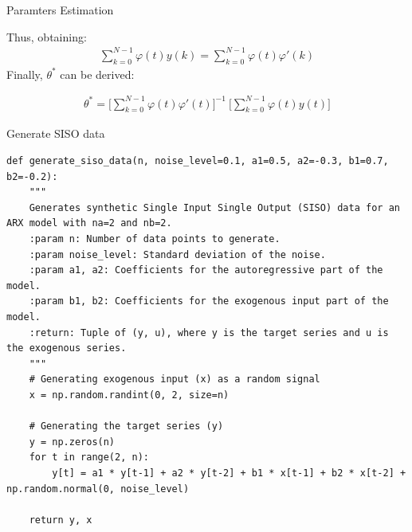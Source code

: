 \documentclass[aspectratio=169,hyperref={pdfpagelabels=false}]{beamer}
\begin{document}
\begin{frame}{Paramters Estimation}
  \begin{block}{}
    Thus, obtaining: 
\begin{align*}
  \sum_{k=0}^{N-1}\varphi(t)y(k) = \sum_{k=0}^{N-1}\varphi(t)\varphi'(k)
\end{align*}
Finally, $\theta^*$ can be derived: 
\begin{center}
\begin{tcolorbox}[width=0.6\linewidth, height = 0.22\linewidth, colframe=red]
    \begin{align*}
      \theta^* = \Biggr[\sum_{k=0}^{N-1}\varphi(t)\varphi'(t)\Biggr]^{-1} \: \Biggr[\sum_{k=0}^{N-1}\varphi(t)y(t)\Biggr]
    \end{align*}
\end{tcolorbox}
\end{center}
\end{block}
\end{frame}

\begin{frame}[fragile]{\small{Generate SISO data}}
  \begin{verbatim}
def generate_siso_data(n, noise_level=0.1, a1=0.5, a2=-0.3, b1=0.7, b2=-0.2):
    """
    Generates synthetic Single Input Single Output (SISO) data for an ARX model with na=2 and nb=2.
    :param n: Number of data points to generate.
    :param noise_level: Standard deviation of the noise.
    :param a1, a2: Coefficients for the autoregressive part of the model.
    :param b1, b2: Coefficients for the exogenous input part of the model.
    :return: Tuple of (y, u), where y is the target series and u is the exogenous series.
    """
    # Generating exogenous input (x) as a random signal
    x = np.random.randint(0, 2, size=n)

    # Generating the target series (y)
    y = np.zeros(n)
    for t in range(2, n):
        y[t] = a1 * y[t-1] + a2 * y[t-2] + b1 * x[t-1] + b2 * x[t-2] + np.random.normal(0, noise_level)

    return y, x
  \end{verbatim}
\end{frame}
\end{document}
